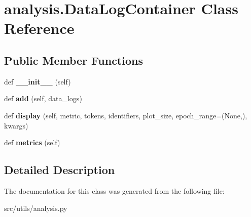 \hypertarget{classanalysis_1_1DataLogContainer}{}\section{analysis.\+Data\+Log\+Container Class Reference}
\label{classanalysis_1_1DataLogContainer}
\subsection*{Public Member Functions}
\begin{DoxyCompactItemize}
\item 
def {\bfseries \+\_\+\+\_\+init\+\_\+\+\_\+} (self)\hypertarget{classanalysis_1_1DataLogContainer_a7129c7e32aab8ec87ea3cb166f4f8131}{}\label{classanalysis_1_1DataLogContainer_a7129c7e32aab8ec87ea3cb166f4f8131}

\item 
def {\bfseries add} (self, data\+\_\+logs)\hypertarget{classanalysis_1_1DataLogContainer_afdd353084bd8e8f18d055daf501c7a72}{}\label{classanalysis_1_1DataLogContainer_afdd353084bd8e8f18d055daf501c7a72}

\item 
def {\bfseries display} (self, metric, tokens, identifiers, plot\+\_\+size, epoch\+\_\+range=(None,), kwargs)\hypertarget{classanalysis_1_1DataLogContainer_a928e1b757e08cf446d020e2d4e8d5d2f}{}\label{classanalysis_1_1DataLogContainer_a928e1b757e08cf446d020e2d4e8d5d2f}

\item 
def {\bfseries metrics} (self)\hypertarget{classanalysis_1_1DataLogContainer_a128523601583ae3990beba92b9451c76}{}\label{classanalysis_1_1DataLogContainer_a128523601583ae3990beba92b9451c76}

\end{DoxyCompactItemize}


\subsection{Detailed Description}
\begin{DoxyVerb}\end{DoxyVerb}
 

The documentation for this class was generated from the following file\+:\begin{DoxyCompactItemize}
\item 
src/utils/analysis.\+py\end{DoxyCompactItemize}
